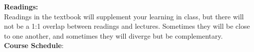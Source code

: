 \documentclass[11pt]{article}
\begin{document}
\noindent\textbf{\large Readings:}\\
Readings in the textbook will supplement your learning in class, but there will not be a 1:1 overlap between readings and lectures. Sometimes they will be close to one another, and sometimes they will diverge but be complementary. \\





\noindent\textbf {\Large Course Schedule}:

\end{document}
